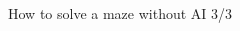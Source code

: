 \documentclass[
  ignorenonframetext,
  aspectratio=169,
]{beamer}
\begin{document}
\begin{frame}[fragile]{How to solve a maze without AI 3/3}
\begin{columns}[T]
\begin{column}{0.5\textwidth}
\end{column}
\end{columns}
\end{frame}
\end{document}
